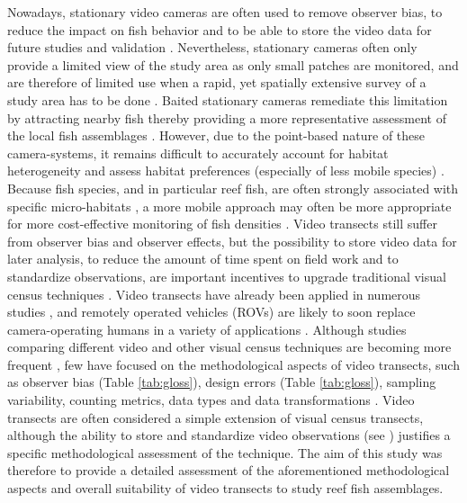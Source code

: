 \documentclass[10pt,letterpaper]{article}
\begin{document}
Nowadays, stationary video cameras are often used to remove observer bias, to reduce the impact on fish behavior and to be able to store the video data for future studies and validation \cite{Cappo2006,Cappo2011,Schmid2017}. Nevertheless, stationary cameras often only provide a limited view of the study area as only small patches are monitored, and are therefore of limited use when a rapid, yet spatially extensive survey of a study area has to be done \cite{Willis2000}. Baited stationary cameras remediate this limitation by attracting nearby fish thereby providing a more representative assessment of the local fish assemblages \cite{Harvey2007}. However, due to the point-based nature of these camera-systems, it remains difficult to accurately account for habitat heterogeneity and assess habitat preferences (especially of less mobile species) \cite{Andradi-Brown2016,Willis2000}. Because fish species, and in particular reef fish, are often strongly associated with specific micro-habitats \cite{Chapman2000}, a more mobile approach may often be more appropriate for more cost-effective monitoring of fish densities \cite{Mallet2014}. Video transects still suffer from observer bias and observer effects, but the possibility to store video data for later analysis, to reduce the amount of time spent on field work and to standardize observations, are important incentives to upgrade traditional visual census techniques \cite{Pelletier2011,Tessier2013}. Video transects have already been applied in numerous studies \cite{Mallet2014,Wartenberg2015}, and remotely operated vehicles (ROVs) are likely to soon replace camera-operating humans in a variety of applications \cite{Schramm2020,Sward2019}. Although studies comparing different video and other visual census techniques are becoming more frequent \cite{Andradi-Brown2016,Langlois2010,Tessier2013,Watson2005,Watson2010,Wilson2018}, few have focused on the methodological aspects of video transects, such as observer bias (Table \ref{tab:gloss}), design errors (Table \ref{tab:gloss}), sampling variability, counting metrics, data types and data transformations \cite{Bernard2013,Goetze2019}. 
Video transects are often considered a simple extension of visual census transects, although the ability to store and standardize video observations (see ) justifies a specific methodological assessment of the technique. The aim of this study was therefore to provide a detailed assessment of the aforementioned methodological aspects and overall suitability of video transects to study reef fish assemblages. 
\end{document}
